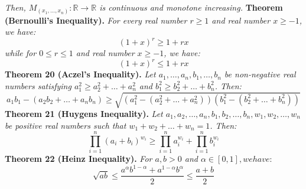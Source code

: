 \documentclass[a4paper,11pt]{article}
\begin{document}
\textit{Then, $M_{(x_1, \dots, x_n)} : \mathbb{R} \to \mathbb{R}$ is continuous and monotone increasing.}
%
%
\textbf{Theorem (Bernoulli’s Inequality).} \textit{For every real number $r \geq 1$ and real number $x \geq -1$, we have:}
\[
(1 + x)^r \geq 1 + rx
\]
\textit{while for $0 \leq r \leq 1$ and real number $x \geq -1$, we have:}
\[
(1 + x)^r \leq 1 + rx
\]
%
%
\textbf{Theorem 20 (Aczel's Inequality).} \textit{Let $a_1, \dots, a_n, b_1, \dots, b_n$ be non-negative real numbers satisfying $a_1^2 \geq a_2^2 + \dots + a_n^2$ and $b_1^2 \geq b_2^2 + \dots + b_n^2$. Then:}
\[
a_1b_1 - (a_2b_2 + \dots + a_nb_n) \geq \sqrt{(a_1^2 - (a_2^2 + \dots + a_n^2))(b_1^2 - (b_2^2 + \dots + b_n^2))}
\]
%
%
\textbf{Theorem 21 (Huygens Inequality).} \textit{Let $a_1, a_2, \dots, a_n, b_1, b_2, \dots, b_n, w_1, w_2, \dots, w_n$ be positive real numbers such that $w_1 + w_2 + \dots + w_n = 1$. Then:}
\[
\prod_{i=1}^n (a_i + b_i)^{w_i} \geq \prod_{i=1}^n a_i^{w_i} + \prod_{i=1}^n b_i^{w_i}
\]
%
%
\textbf{Theorem 22 (Heinz Inequality).} \textit{For $a, b > 0$ and $\alpha \in [0, 1], we have:$}
\[
\sqrt{ab} \leq \frac{a^{\alpha}b^{1-\alpha} + a^{1-\alpha}b^{\alpha}}{2} \leq \frac{a + b}{2}
\]
\end{document}

